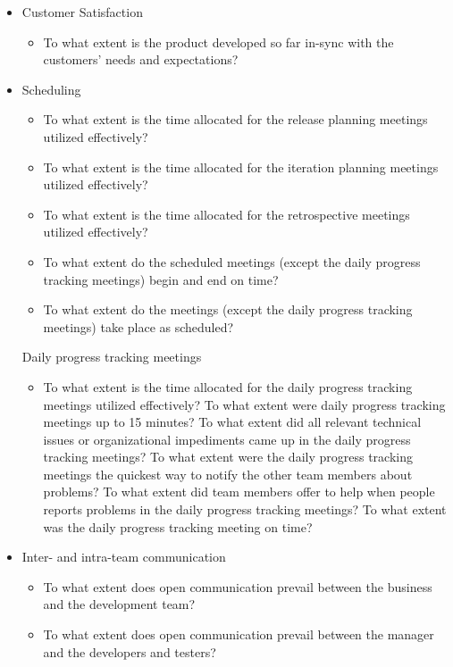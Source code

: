 \begin{appendices}
\begin{itemize}
\begin{itemize}
		\end{itemize}
		\begin{itemize}
			\item Customer Satisfaction
				\begin{itemize}
					\item To what extent is the product developed so far in-sync with the customers' needs and expectations?
				\end{itemize}
			\item Scheduling
				\begin{itemize}
					\item To what extent is the time allocated for the release planning meetings utilized effectively? 
					\item To what extent is the time allocated for the iteration planning meetings utilized effectively?
					\item To what extent is the time allocated for the retrospective meetings utilized effectively? 
					\item To what extent do the scheduled meetings (except the daily progress tracking meetings) begin and end on time? 
					\item To what extent do the meetings (except the daily progress tracking meetings) take place as scheduled? 
				\end{itemize}
			\addition Daily progress tracking meetings
				\begin{itemize}
					\item To what extent is the time allocated for the daily progress tracking meetings utilized effectively? 
					\addition To what extent were daily progress tracking meetings up to 15 minutes?
					\addition To what extent did all relevant technical issues or organizational impediments came up in the daily progress tracking meetings?
					\addition To what extent were the daily progress tracking meetings the quickest way to notify the other team members about problems?
					\addition To what extent did team members offer to help when people reports problems in the daily progress tracking meetings?
					\addition To what extent was the daily progress tracking meeting on time?
				\end{itemize}
			\item Inter- and intra-team communication
				\begin{itemize}
					\item To what extent does open communication prevail between the business and the development team? 
					\item To what extent does open communication prevail between the manager and the developers and testers? 

\end{itemize}
\end{itemize}
\end{itemize}
\end{appendices}

